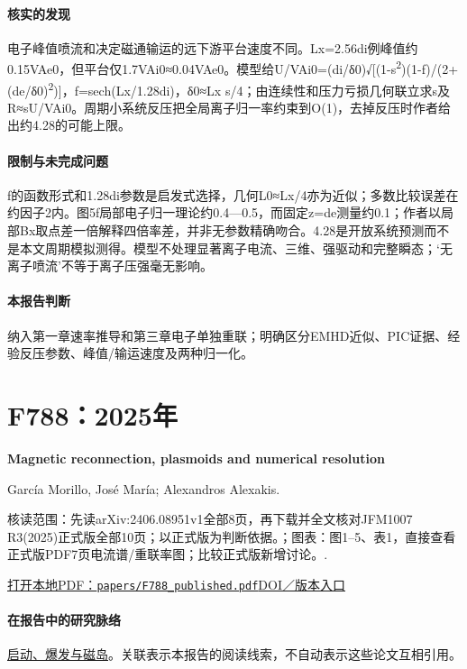 \paragraph{核实的发现}电子峰值喷流和决定磁通输运的远下游平台速度不同。Lx=2.56di例峰值约0.15VAe0，但平台仅1.7VAi0≈0.04VAe0。模型给U/VAi0=(di/δ0)√[(1-s\textsuperscript{2})(1-f)/(2+(de/δ0)\textsuperscript{2})]，f=sech(Lx/1.28di)，δ0≈Lx s/4；由连续性和压力亏损几何联立求s及R≈sU/VAi0。周期小系统反压把全局离子归一率约束到O(1)，去掉反压时作者给出约4.28的可能上限。

\paragraph{限制与未完成问题}f的函数形式和1.28di参数是启发式选择，几何L0≈Lx/4亦为近似；多数比较误差在约因子2内。图5f局部电子归一理论约0.4—0.5，而固定z=de测量约0.1；作者以局部Bx取点差一倍解释四倍率差，并非无参数精确吻合。4.28是开放系统预测而不是本文周期模拟测得。模型不处理显著离子电流、三维、强驱动和完整瞬态；‘无离子喷流’不等于离子压强毫无影响。

\paragraph{本报告判断}纳入第一章速率推导和第三章电子单独重联；明确区分EMHD近似、PIC证据、经验反压参数、峰值/输运速度及两种归一化。

\section{F788：2025年}\label{paper:F788}

\textbf{Magnetic reconnection,  plasmoids and numerical resolution}\citep{F788}\

García Morillo,  José María;  Alexandros Alexakis.

\textsf{核读范围：}先读arXiv:2406.08951v1全部8页，再下载并全文核对JFM1007 R3(2025)正式版全部10页；以正式版为判断依据。；\textsf{图表：}图1–5、表1，直接查看正式版PDF7页电流谱/重联率图；比较正式版新增讨论。.

\href{run:papers/F788_published.pdf}{打开本地PDF：\texttt{papers/F788\_published.pdf}}\quad\href{https://doi.org/10.1017/jfm.2025.109}{DOI／版本入口}

\paragraph{在报告中的研究脉络}\hyperref[story:onset]{启动、爆发与磁岛}。关联表示本报告的阅读线索，不自动表示这些论文互相引用。

